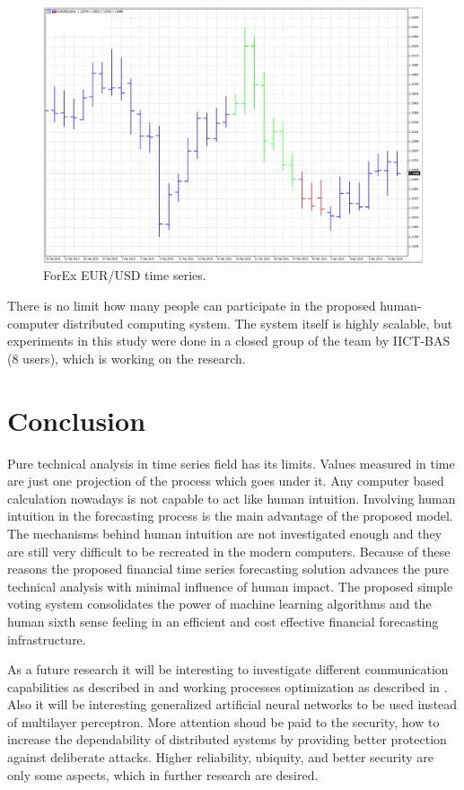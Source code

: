\documentclass[runningheads]{llncs}
\begin{document}
\begin{figure}
\includegraphics[width=1.0\textwidth]{fig03.png}
\centering
\caption{ForEx EUR/USD time series.} \label{fig03}
\end{figure}
\FloatBarrier

There is no limit how many people can participate in the proposed human-computer distributed computing system. The system itself is highly scalable, but experiments in this study were done in a closed group of the team by IICT-BAS (8 users), which is working on the research. 

\section{Conclusion} \label{Conclusion}

Pure technical analysis in time series field has its limits. Values measured in time are just one projection of the process which goes under it. Any computer based calculation nowadays is not capable to act like human intuition. Involving human intuition in the forecasting process is the main advantage of the proposed model. The mechanisms behind human intuition are not investigated enough and they are still very difficult to be recreated in the modern computers. Because of these reasons the proposed financial time series forecasting solution advances the pure technical analysis with minimal influence of human impact. The proposed simple voting system consolidates the power of machine learning algorithms and the human sixth sense feeling in an efficient and cost effective financial forecasting infrastructure.

As a future research it will be interesting to investigate different communication capabilities as described in \cite{alexandrov01} and working processes optimization as described in \cite{atanasov01}. Also it will be interesting generalized artificial neural networks \cite{tashev01} to be used instead of multilayer perceptron. More attention shoud be paid to the security, how to increase the dependability of distributed systems by providing better protection against deliberate attacks. Higher reliability, ubiquity, and better security are only some aspects, which in further research are desired.
\end{document}
